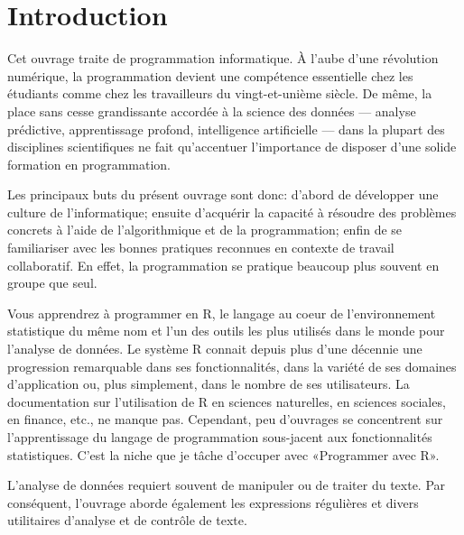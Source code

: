 
\chapter{Introduction}

Cet ouvrage traite de programmation informatique. À l'aube d'une
révolution numérique, la programmation devient une compétence
essentielle chez les étudiants comme chez les travailleurs du
vingt-et-unième siècle. De même, la place sans cesse grandissante
accordée à la science des données --- analyse prédictive,
apprentissage profond, intelligence artificielle --- dans la plupart
des disciplines scientifiques ne fait qu'accentuer l'importance de
disposer d'une solide formation en programmation.

Les principaux buts du présent ouvrage sont donc: d'abord de
développer une culture de l'informatique; ensuite d'acquérir la
capacité à résoudre des problèmes concrets à l'aide de l'algorithmique
et de la programmation; enfin de se familiariser avec les bonnes
pratiques reconnues en contexte de travail collaboratif. En effet, la
programmation se pratique beaucoup plus souvent en groupe que seul.

Vous apprendrez à programmer en R, le langage au coeur de
l'environnement statistique du même nom et l'un des outils les plus
utilisés dans le monde pour l'analyse de données. Le système R connait
depuis plus d'une décennie une progression remarquable dans ses
fonctionnalités, dans la variété de ses domaines d'application ou,
plus simplement, dans le nombre de ses utilisateurs. La documentation
sur l'utilisation de R en sciences naturelles, en sciences sociales,
en finance, etc., ne manque pas. Cependant, peu d'ouvrages se
concentrent sur l'apprentissage du langage de programmation
sous-jacent aux fonctionnalités statistiques. C'est la niche que je
tâche d'occuper avec «Programmer avec R».

L'analyse de données requiert souvent de manipuler ou de traiter du
texte. Par conséquent, l'ouvrage aborde également les expressions
régulières et divers utilitaires d'analyse et de contrôle de texte.

